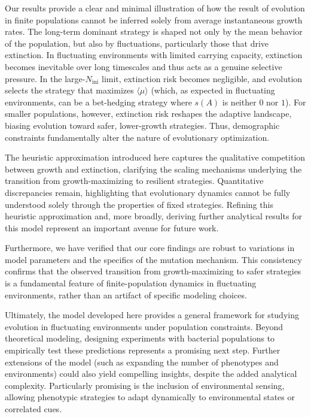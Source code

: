 \documentclass[aps,pre,reprint,10pt,superscriptaddress]{revtex4-2}
\begin{document}
Our results provide a clear and minimal illustration of how the result of evolution in finite populations cannot be inferred solely from average instantaneous growth rates. The long-term dominant strategy is shaped not only by the mean behavior of the population, but also by fluctuations, particularly those that drive extinction. In fluctuating environments with limited carrying capacity, extinction becomes inevitable over long timescales and thus acts as a genuine selective pressure. In the large-$N_\text{ini}$ limit, extinction risk becomes negligible, and evolution selects the strategy that maximizes $\langle\mu\rangle$ (which, as expected in fluctuating environments, can be a bet-hedging strategy where $s(A)$ is neither $0$ nor $1$). For smaller populations, however, extinction risk reshapes the adaptive landscape, biasing evolution toward safer, lower-growth strategies. Thus, demographic constraints fundamentally alter the nature of evolutionary optimization.

The heuristic approximation introduced here captures the qualitative competition between growth and extinction, clarifying the scaling mechanisms underlying the transition from growth-maximizing to resilient strategies. Quantitative discrepancies remain, highlighting that evolutionary dynamics cannot be fully understood solely through the properties of fixed strategies. Refining this heuristic approximation and, more broadly, deriving further analytical results for this model represent an important avenue for future work.

Furthermore, we have verified that our core findings are robust to variations in model parameters and the specifics of the mutation mechanism. This consistency confirms that the observed transition from growth-maximizing to safer strategies is a fundamental feature of finite-population dynamics in fluctuating environments, rather than an artifact of specific modeling choices.

Ultimately, the model developed here provides a general framework for studying evolution in fluctuating environments under population constraints. Beyond theoretical modeling, designing experiments with bacterial populations to empirically test these predictions represents a promising next step. Further extensions of the model (such as expanding the number of phenotypes and environments) could also yield compelling insights, despite the added analytical complexity. Particularly promising is the inclusion of environmental sensing, allowing phenotypic strategies to adapt dynamically to environmental states or correlated cues.
\end{document}

